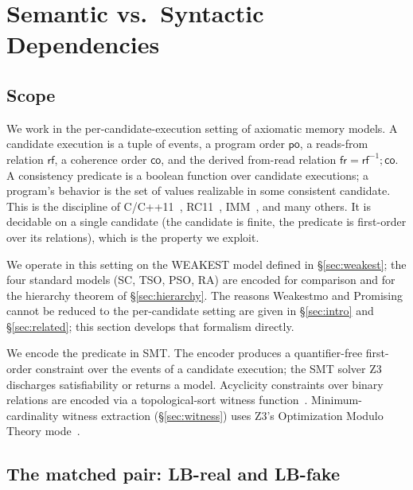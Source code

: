 \documentclass{llncs}
\newcommand{\rf}{\mathsf{rf}}
\newcommand{\co}{\mathsf{co}}
\newcommand{\fr}{\mathsf{fr}}
\newcommand{\po}{\mathsf{po}}
\begin{document}
\section{Semantic vs.\ Syntactic Dependencies}
\label{sec:consistency}

\subsection{Scope}
\label{sec:scope}

We work in the per-candidate-execution setting of axiomatic memory models. A
candidate execution is a tuple of events, a program order $\po$, a reads-from
relation $\rf$, a coherence order $\co$, and the derived from-read relation
$\fr = \rf^{-1} ; \co$. A consistency predicate is a boolean function over
candidate executions; a program's behavior is the set of values realizable in
some consistent candidate. This is the discipline of
C/C++11~\cite{batty2015problem}, RC11~\cite{lahav2017repairing},
IMM~\cite{podkopaev2019bridging}, and many others. It is decidable on a single
candidate (the candidate is finite, the predicate is first-order over its
relations), which is the property we exploit.

We operate in this setting on the WEAKEST model defined in
\S\ref{sec:weakest}; the four standard models (SC, TSO, PSO, RA) are encoded
for comparison and for the hierarchy theorem of \S\ref{sec:hierarchy}. The
reasons Weakestmo and Promising cannot be reduced to the per-candidate setting
are given in \S\ref{sec:intro} and \S\ref{sec:related}; this section develops
that formalism directly.

We encode the predicate in SMT. The encoder produces a quantifier-free
first-order constraint over the events of a candidate execution; the SMT
solver Z3~\cite{demoura2008z3} discharges satisfiability or returns a model.
Acyclicity constraints over binary relations are encoded via a topological-sort
witness function~\cite{gavrilenko2019bmc}. Minimum-cardinality witness
extraction (\S\ref{sec:witness}) uses Z3's Optimization Modulo Theory
mode~\cite{bjorner2015nuz}.

\subsection{The matched pair: LB-real and LB-fake}
\label{sec:matched-pair}
\end{document}
